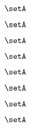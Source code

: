 \begin{forslides}
    \begin{equation}
        \label{eq:slides-processes-162}
        \setA
    \end{equation}

    \begin{equation}
        \label{eq:slides-processes-163}
        \setA
    \end{equation}

    \begin{equation}
        \label{eq:slides-processes-164}
        \setA
    \end{equation}

    \begin{equation}
        \label{eq:slides-processes-165}
        \setA
    \end{equation}

    \begin{equation}
        \label{eq:slides-processes-166}
        \setA
    \end{equation}

    \begin{equation}
        \label{eq:slides-processes-167}
        \setA
    \end{equation}

    \begin{equation}
        \label{eq:slides-processes-168}
        \setA
    \end{equation}

    \begin{equation}
        \label{eq:slides-processes-169}
        \setA
    \end{equation}
        
        
    \end{forslides}
